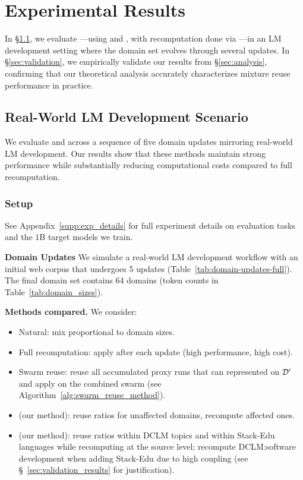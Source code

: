 \section{Experimental Results}\label{sec:results}

In \S\ref{sec:superswarm}, we evaluate \olmix---using \fullmixreuse and \partialmixreuse, with recomputation done via \base---in an LM development setting where the domain set evolves through several updates. In \S\ref{sec:validation}, we empirically validate our results from \S\ref{sec:analysis}, confirming that our theoretical analysis accurately characterizes mixture reuse performance in practice.


\subsection{Real-World LM Development Scenario}\label{sec:superswarm}

We evaluate \fullmixreuse and \partialmixreuse across a sequence of five domain updates mirroring real-world LM development. Our results show that these methods maintain strong performance while substantially reducing computational costs compared to full recomputation.

\subsubsection{Setup}

See Appendix~\ref{supp:exp_details} for full experiment details on evaluation tasks and the $1$B target models we train.

\textbf{Domain Updates} We simulate a real-world LM development workflow with an initial web corpus that undergoes 5 updates (Table~\ref{tab:domain-updates-full}). 
The final domain set contains 64 domains (token counts in Table~\ref{tab:domain_sizes}).



\textbf{Methods compared.} We consider:
\begin{itemize}[itemsep=0pt,topsep=0pt,leftmargin=12pt]
    \item Natural: mix proportional to domain sizes.
    \item Full recomputation: apply \base after each update (high performance, high cost).
    \item Swarm reuse: reuse all accumulated proxy runs that can represented on $\mathcal{D}'$ and apply \base on the combined swarm (see Algorithm~\ref{alg:swarm_reuse_method}). 
    \item \fullmixreuse (our method): reuse ratios for unaffected domains, recompute affected ones. 
    \item \partialmixreuse (our method): reuse ratios within DCLM topics and within Stack-Edu languages while recomputing at the source level; recompute DCLM:software development when adding Stack-Edu due to high coupling (see \S~\ref{sec:validation_results} for justification).
\end{itemize}




